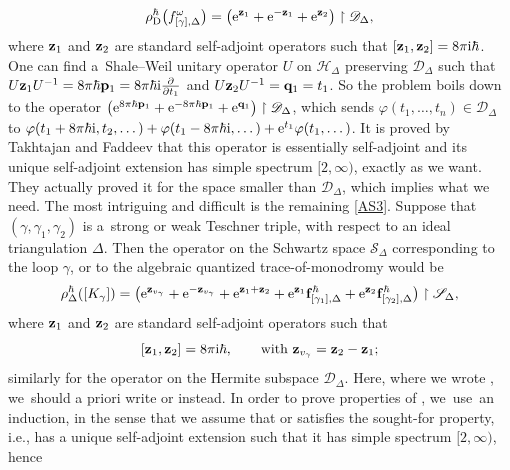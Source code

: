 \documentclass[pdftex]{sigma}
\numberwithin{equation}{section}
\theoremstyle{definition}
\begin{document}
\[
\rho^\hbar_{\rm D}\bigl(f^\omega_{[\gamma],\Delta}\bigr) = \bigl({\rm e}^{{\bf z}_1} + {\rm e}^{-{\bf z}_1} + {\rm e}^{{\bf z}_2} \bigr)\restriction \mathscr{D}_\Delta,
\]
where ${\bf z}_1$ and ${\bf z}_2$ are standard self-adjoint operators such that $[{\bf z}_1, {\bf z}_2] = 8 \pi {\rm i} \hbar$. One can find a~Shale--Weil unitary operator $U$ on $\mathscr{H}_\Delta$ preserving $\mathscr{D}_\Delta$ such that $U {\bf z}_1 U^{-1} = 8 \pi \hbar {\bf p}_1 = 8 \pi \hbar {\rm i} \frac{\partial}{\partial t_1}$ and $U {\bf z}_2 U^{-1} = {\bf q}_1 = t_1$. So the problem boils down to the operator $\bigl({\rm e}^{8\pi \hbar {\bf p}_1} + {\rm e}^{-8\pi \hbar {\bf p}_1} + {\rm e}^{{\bf q}_1}\bigr)\restriction \mathscr{D}_\Delta$, which sends $\varphi(t_1,\dots,t_n) \in \mathscr{D}_\Delta$ to $\varphi(t_1 + 8\pi \hbar {\rm i}, t_2,\dots) + \varphi(t_1 - 8\pi \hbar {\rm i}, \dots) + {\rm e}^{t_1} \varphi(t_1,\dots)$. It is proved by Takhtajan and Faddeev \cite{FT} that this operator is essentially self-adjoint and its unique self-adjoint extension has simple spectrum $[2,\infty)$, exactly as we want. They actually proved it for the space smaller than $\mathscr{D}_\Delta$, which implies what we need.
The most intriguing and difficult is the remaining \ref{AS3}. Suppose that $(\gamma,\gamma_1,\gamma_2)$ is a~strong or weak Teschner triple, with respect to an ideal triangulation $\Delta$. Then the operator on the Schwartz space $\mathscr{S}_\Delta$ corresponding to the loop $\gamma$, or to the algebraic quantized trace-of-monodromy would be
\begin{align*}
\rho^\hbar_\Delta([K_\gamma]) = \bigl( {\rm e}^{{\bf z}_{v_\gamma}} + {\rm e}^{-{\bf z}_{v_\gamma}} + {\rm e}^{{\bf z}_1 + {\bf z}_2} + {\rm e}^{{\bf z}_1} {\bf f}^\hbar_{[\gamma_1],\Delta} + {\rm e}^{{\bf z}_2} {\bf f}^\hbar_{[\gamma_2],\Delta}\bigr) \restriction \mathscr{S}_\Delta,
\end{align*}
where ${\bf z}_1$ and ${\bf z}_2$ are standard self-adjoint operators such that
\[
[{\bf z}_1,{\bf z}_2]=8\pi {\rm i} \hbar, \qquad \text{with ${\bf z}_{v_\gamma} = {\bf z}_2 - {\bf z}_1$};
\]
 similarly for the operator  on the Hermite subspace $\mathscr{D}_\Delta$. Here, where we wrote , we~should a priori write \smash{$\rho^\hbar_\Delta([K_{\gamma_j}])$} or  instead. In order to prove properties of , we~use~an induction, in the sense that we assume that \smash{$\rho^\hbar_\Delta([K_{\gamma_j}])$} or  satisfies the sought-for property, i.e., has a unique self-adjoint extension  such that it has simple spectrum $[2,\infty)$, hence
\end{document}
